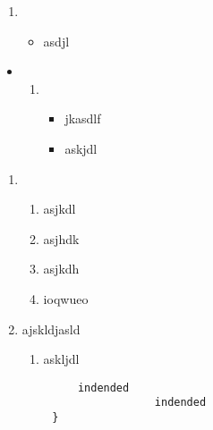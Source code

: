 \documentclass{xyz}
\begin{document}
    \begin{enumerate}
        \item {
        \begin{itemize}
            \item {
            asdjl
            }
        \end{itemize}
        }
    \end{enumerate}

    \begin{itemize}
        \item {
        \begin{enumerate}
            \item {
            \begin{itemize}
                \item jkasdlf
                \item {
                askjdl
                }
            \end{itemize}
            }
        \end{enumerate}
        }
    \end{itemize}

    \begin{enumerate}
        \item {
        \begin{enumerate}
            \item asjkdl
            \item {
            asjhdk
            }
            \item {asjkdh}
            \item {
            ioqwueo
            }
        \end{enumerate}
        }
        \item {
        ajskldjasld
        }
        \begin{enumerate}
            \item askljdl
        \end{enumerate}
    \end{enumerate}

    \begin{verbatim}
            indended
                        indended
        }
    \end{verbatim}
\end{document}
